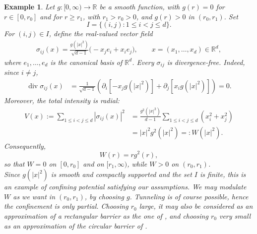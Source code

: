 \documentclass[a4paper,10pt]{amsart}
\newcommand{\R}{\mathbb{R}}
\newtheorem{example}[theorem]{Example}
\theoremstyle{remark}
\numberwithin{equation}{section}
\begin{document}
\begin{example}\label{ex:magnetic}
Let $g:[0,\infty)\rightarrow\mathbb{R}$ be a smooth function, with $g\left(
r\right)  =0$ for $r\in\left[  0,r_{0}\right]  $ and for $r\geq r_{1}$, with
$r_{1}>r_{0}>0$, and $g\left(  r\right)  >0$ in $\left(  r_{0},r_{1}\right)
$.
Set
\begin{equation*}
    I=\{(i,j):1\leq i<j\leq d\}.
\end{equation*}
For $(i,j)\in I$, define the real-valued vector field
\begin{align*}
    \sigma_{ij}(x)
  =\frac{g(|x|^2)}{\sqrt{d-1}}
    \bigl(-x_j e_i+x_i e_j\bigr),
  \qquad x=(x_1,\ldots,x_d)\in\R^d,
\end{align*}
where $e_1,\ldots,e_d$ is the canonical basis of $\R^d$. Every $\sigma_{ij}$ is divergence-free. Indeed, since $i\neq j$,
\begin{align*}
  \operatorname{div}\sigma_{ij}(x)
  &=\frac{1}{\sqrt{d-1}}
    \left(
      \partial_i\left[-x_jg(|x|^2)\right]
      +\partial_j\left[x_i g(|x|^2)\right]
    \right)
   =0.
\end{align*}
Moreover, the total intensity is radial:
\begin{align*}
  V(x)
  :=\sum_{1\leq i<j\leq d}|\sigma_{ij}(x)|^2
  &=\frac{g^2(|x|^2)}{d-1}
    \sum_{1\leq i<j\leq d}(x_i^2+x_j^2) \\
  &=|x|^2g^2(|x|^2)
   =:W(|x|^2).
\end{align*}
Consequently,
\begin{equation*}
    W(r)=r g^2(r),
\end{equation*}
so that $W=0$ on $[0,r_0]$ and on $[r_1,\infty)$, while $W>0$ on
$(r_0,r_1)$.    \\
Since $g(|x|^2)$ is smooth and compactly supported and the set $I$ is finite, this is an example of confining
potential satisfying our assumptions. We may modulate $W$ as we want in $\left(
r_{0},r_{1}\right)  $, by choosing $g$. Tunneling is of course possible, hence
the confinement is only partial. Choosing $r_{0}$ large, it may also be
considered as an approximation of a rectangular barrier as the one of
\cite{Moh}, and choosing $r_{0}$ very small as an approximation of the
circular barrier of \cite{RakYus}.
 
\end{example}
\end{document}
